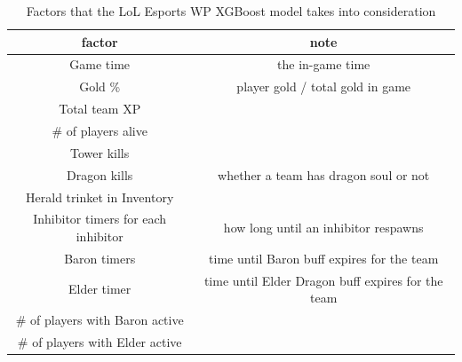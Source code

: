 \documentclass[11pt,a4paper,oneside]{report}
\begin{document}
\begin{table}[H]
  \centering
  \caption{Factors that the LoL Esports WP XGBoost model takes into consideration \cite{lol-esports-2023}}
  \label{tab:lol_esports_factors}
  \begin{tabular}{cc}
    \hline
    \textbf{factor}                     & \textbf{note}                                     \\
    \hline
    Game time                           & the in-game time                                  \\
    Gold \%                             & player gold / total gold in game                  \\
    Total team XP                       &                                                   \\
    \# of players alive
                                        &                                                   \\
    Tower kills
                                        &                                                   \\
    Dragon kills
                                        & whether a team has dragon soul or not             \\
    Herald trinket in Inventory
                                        &                                                   \\
    Inhibitor timers for each inhibitor & how long until an inhibitor respawns              \\
    Baron timers                        & time until Baron buff expires for the team        \\
    Elder timer                         & time until Elder Dragon buff expires for the team \\
    \# of players with Baron active     &                                                   \\
    \# of players with Elder active     &                                                   \\
    \hline
  \end{tabular}
\end{table}


\end{document}
